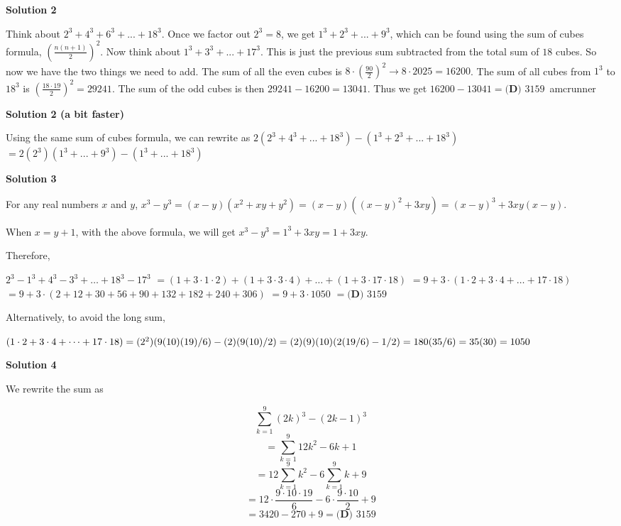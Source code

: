 \begin{enumerate}
\textbf{Solution 2}

Think about $2^3+4^3+6^3+...+18^3$. Once we factor out $2^3=8$, we get $1^3+2^3+...+9^3$, which can be found using the sum of cubes formula, $(\frac{n(n+1)}{2})^2$. Now think about $1^3+3^3+...+17^3$. This is just the previous sum subtracted from the total sum of $18$ cubes. So now we have the two things we need to add. The sum of all the even cubes is $8\cdot (\frac{90}{2})^2\rightarrow 8\cdot 2025 = 16200$. The sum of all cubes from $1^3$ to $18^3$ is $(\frac{18\cdot 19}{2})^2=29241$. The sum of the odd cubes is then $29241-16200=13041$. Thus we get $16200-13041=\boxed{\textbf{(D) } 3159}$~amcrunner

 



\textbf{Solution 2 (a bit faster)}

Using the same sum of cubes formula, we can rewrite as $2(2^3 + 4^3 + ... + 18^3) - (1^3 + 2^3 + ... + 18^3)$
$= 2(2^3)(1^3 + ... + 9^3) - (1^3 + ... + 18^3)$




\textbf{Solution 3}

For any real numbers $x$ and $y$, $x^3-y^3=(x-y)(x^2+xy+y^2)=(x-y)((x-y)^2+3xy)=(x-y)^3+3xy(x-y)$. 

 When $x = y + 1$, with the above formula, we will get $x^3-y^3=1^3+3xy=1 + 3xy$.

 Therefore, 

 $2^3 - 1^3 + 4^3 - 3^3 + \dots + 18^3 - 17^3$
$= (1 + 3\cdot 1\cdot 2) + (1 + 3\cdot 3\cdot 4) + \dots + (1 + 3\cdot 17\cdot 18)$
$= 9 + 3\cdot (1\cdot 2 + 3\cdot 4 + \dots + 17\cdot 18)$
$= 9 + 3 \cdot (2 + 12 + 30 + 56 + 90 + 132 + 182 + 240 + 306)$
$= 9 + 3 \cdot 1050$
$= \boxed{\textbf{(D) } 3159}$

 Alternatively, to avoid the long sum, 

 $(1\cdot 2 + 3\cdot 4 + \dots + 17\cdot 18) \\  = (2^2)(9(10)(19)/6) - (2)(9(10)/2) \\ =(2)(9)(10)(2(19/6) - 1/2) \\ = 180(35/6) = 35(30) = 1050$




\textbf{Solution 4}

We rewrite the sum as 

 
 \[\sum_{k=1}^{9}(2k)^3-(2k-1)^3\]
 \[=\sum_{k=1}^{9} 12k^2 - 6k + 1\]
 \[=12\sum_{k=1}^{9}k^2 - 6\sum_{k=1}^{9}k + 9\]
 \[=12\cdot\frac{9\cdot 10\cdot 19}{6} -6\cdot \frac{9\cdot 10}{2} + 9\]
 \[=3420 - 270 + 9 = \boxed{\textbf{(D) } 3159}\]


\end{enumerate}
